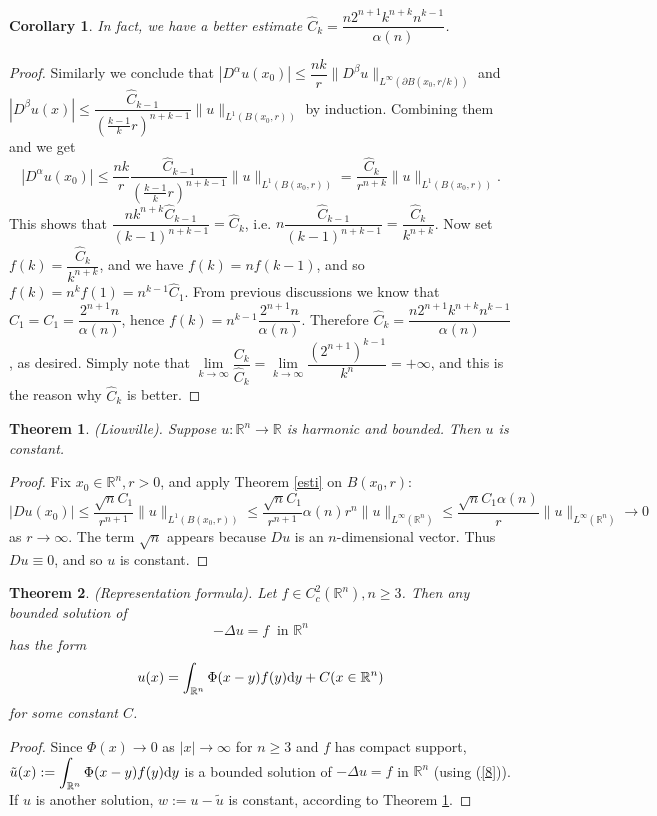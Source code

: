 \documentclass[hyperref,UTF8,12pt]{article}
\numberwithin{equation}{subsection}
\theoremstyle{plain}
\newtheorem{theorem}{Theorem}
\newtheorem{corollary}{Corollary}
\theoremstyle{definition}
\numberwithin{theorem}{section}
\numberwithin{lemma}{section}
\numberwithin{proposition}{section}
\numberwithin{remark}{section}
\numberwithin{corollary}{section}
\numberwithin{definition}{section}
\numberwithin{problem}{section}
\numberwithin{example}{section}
\def\dif{\textup{d}}
\newcommand{\toi}[1]{{#1}\to\infty}
\newcommand{\dis}{\displaystyle}
\newcommand{\limls}{\lim\limits}
\newcommand{\ptl}{\partial}
\newcommand{\mr}{\mathbb{R}}
\renewcommand{\leq}{\leqslant}
\renewcommand{\geq}{\geqslant}
\begin{document}
\begin{corollary}
In fact, we have a better estimate $\hat{C}_k=\dfrac{n2^{n+1}k^{n+k}n^{k-1}}{\alpha(n)}$. 
\end{corollary}
\begin{proof}
Similarly we conclude that $|D^\alpha u(x_0)|\leq\dfrac{nk}{r}\|D^\beta u\|_{L^\infty(\ptl B(x_0,r/k))}$ and $|D^\beta u(x)|\leq\dfrac{\hat{C}_{k-1}} {\left(\frac{k-1}{k}r\right)^{n+k-1}}\|u\|_{L^1(B(x_0,r))}$ by induction. Combining them and we get \[|D^\alpha u(x_0)|\leq\frac{nk}{r}\dfrac{\hat{C}_{k-1}} {\left(\frac{k-1}{k}r\right)^{n+k-1}}\|u\|_{L^1(B(x_0,r))}=\frac{\hat{C}_k}{r^{n+k}}\|u\|_{L^1(B(x_0,r))}.\]This shows that $\dfrac{nk^{n+k}\hat{C}_{k-1}}{(k-1)^{n+k-1}} =\hat{C}_k$, i.e. $n\dfrac{\hat{C}_{k-1}}{(k-1)^{n+k-1}}=\dfrac{\hat{C}_k}{k^{n+k}} $. Now set $f(k)=\dfrac{\hat{C}_k}{k^{n+k}}$, and we have $f(k)=nf(k-1)$, and so $f(k)=n^kf(1)=n^{k-1}\hat{C}_1$. From previous discussions we know that $\hat{C}_1= C_1=\dfrac{2^{n+1}n}{\alpha(n)}$, hence $f(k)=n^{k-1}\dfrac{2^{n+1}n}{\alpha(n)}$. Therefore $\hat{C}_k=\dfrac{n2^{n+1}k^{n+k}n^{k-1}}{\alpha(n)}$, as desired. Simply note that $\limls_{\toi{k}}\dfrac{C_k}{\hat{C}_k}=\limls_{\toi{k}}\dfrac {(2^{n+1})^{k-1}}{k^n}=+\infty$, and this is the reason why $\hat{C}_k$ is better.
\end{proof}
\begin{theorem}\label{Liou}
(Liouville). Suppose $u:\mr^n\to\mr$ is harmonic and bounded. Then $u$ is constant.
\end{theorem}
\begin{proof}
Fix $x_0\in\mr^n,r>0$, and apply Theorem \ref{esti} on $B(x_0,r)$:\[|Du(x_0)|\leq
\frac{\sqrt{n}C_1}{r^{n+1}}\|u\|_{L^1(B(x_0,r))}\leq\frac{\sqrt{n}C_1}{r^{n+1}}\alpha(n)r^n\|u\|_{L^\infty(\mr^n)}\leq\frac{\sqrt{n}C_1\alpha(n)}{r}\|u\|_{L^\infty(\mr^n)}\to0\]as $\toi{r}$. The term $\sqrt{n}$ appears because $Du$ is an $n$-dimensional vector. Thus $Du\equiv0$, and so $u$ is constant.
\end{proof}
\begin{theorem}
(Representation formula). Let $f\in C_c^2(\mr^n),n\geq3$. Then any bounded solution of
\[-\Delta u=f~\text{~in } \mr^n\]has the form
\[u(x)=\int_{\mr^n}\Phi(x-y)f(y)\dif y+C (x\in\mr^n)\]for some constant $C$.
\end{theorem}
\begin{proof}
Since $\Phi(x)\to0$ as $|x|\to\infty$ for $n\geq3$ and $f$ has compact support, $\tilde{u}(x):=\dis\int_{\mr^n}\Phi(x-y) f(y)\dif y$ is a bounded solution of $-\Delta u=f$ in $\mr^n$ (using (\ref{8})). If $u$ is another solution, $w:=u-\tilde{u}$ is constant, according to Theorem \ref{Liou}.
\end{proof}
\end{document}

